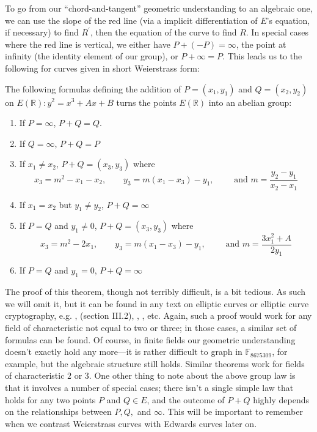 To go from our ``chord-and-tangent'' geometric understanding to an algebraic
    one, we can use the slope of the red line (via a implicit differentiation
    of $E$'s equation, if necessary) to find $R^\prime$, then the equation of
    the curve to find $R$.
In special cases where the red line is vertical, we either have $P + (-P)
    = \infty$, the point at infinity (the identity element of our group), or $P
    + \infty = P$.
This leads us to the following for curves given in short Weierstrass form:
\begin{thm}\label{thm:wgl}
  The following formulas defining the addition of $P = (x_1,  y_1)$ and $Q =
  (x_2, y_2)$ on $E(\mathbb{R}): y^2 = x^3 + Ax + B$ turns the points
  $E(\mathbb{R})$ into an abelian group:
  \begin{enumerate}
  \item If $P = \infty$, $P + Q = Q$.
  \item If $Q = \infty$, $P + Q = P$
  \item If $x_1 \ne x_2$, $P + Q = (x_3, y_3)$ where
    \begin{displaymath}
      x_3 = m^2 - x_1 - x_2, \qquad y_3 = m(x_1 - x_3) - y_1, \qquad
      \text{ and } m = \frac{y_2 - y_1}{x_2 - x_1}
    \end{displaymath}
  \item If $x_1 = x_2$ but $y_1 \ne y_2$, $P + Q = \infty$
  \item If $P = Q$ and $y_1 \ne 0$, $P + Q = (x_3, y_3)$ where
    \begin{displaymath}
      x_3 = m^2 - 2x_1, \qquad y_3 = m(x_1 - x_3) - y_1, \qquad
      \text{ and } m = \frac{3x_1^2 + A}{2y_1}
    \end{displaymath}
  \item If $P = Q$ and $y_1 = 0$, $P + Q = \infty$
  \end{enumerate}
\end{thm}
The proof of this theorem, though not terribly difficult, is a bit tedious.
As such we will omit it, but it can be found in any text on elliptic curves or
    elliptic curve cryptography, e.g. \cite{washington2008elliptic},
    \cite{silverman2009arithmetic} (section III.2),
    \cite{koblitz2004algebraic}, \cite{cohen2005handbook}, etc.
Again, such a proof would work for any field of characteristic not equal to two
    or three; in those cases, a similar set of formulas can be found.
Of course, in finite fields our geometric understanding doesn't exactly hold
    any more---it is rather difficult to graph in $\mathbb{F}_{8675309}$, for
    example, but the algebraic structure still holds.
Similar theorems work for fields of characteristic $2$ or $3$.
One other thing to note about the above group law is that it involves a number
    of special cases; there isn't a single simple law that holds for any two
    points $P$ and $Q \in E$, and the outcome of $P + Q$ highly depends on the
    relationships between $P, Q,$ and $\infty$.
This will be important to remember when we contrast Weierstrass curves with
    Edwards curves later on.

